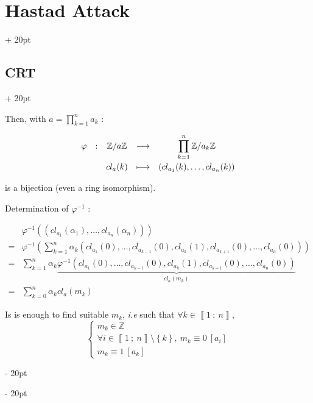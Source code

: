 \documentclass[a4paper, 12pt, twoside]{article}
\newcommand{\Z}{\mathbb{Z}} %
\newcommand{\nset}[2]{\left\llbracket #1\ ;\ #2 \right\rrbracket}
\newcommand{\lr}[1]{\left( #1 \right)}
\newcommand{\set}[1]{\left\{ #1 \right\}}
\newcommand{\ind}[1][20pt]{\advance\leftskip + #1}
\newcommand{\deind}[1][20pt]{\advance\leftskip - #1}
\newenvironment{indt}[2][20pt]{#2 \par \ind[#1]}{\par \deind} %
\begin{document}
\begin{indt}{\section{Hastad Attack}}
\begin{indt}{\subsection{CRT}}
\begin{pseudocode}
                Then, with $\displaystyle a = \prod_{k = 1}^n a_k$ :
            
                \[
                    \begin{array}{ccccc}
                        \varphi & : & \Z/a\Z & \longrightarrow & \displaystyle \prod_{k = 1}^n \Z / a_k \Z
                        \vspace{3pt}
                        \\
                                &   & cl_a(k) & \longmapsto & (cl_{a_1}(k), \ldots, cl_{a_n}(k))
                    \end{array}
                \]
            
                is a bijection (even a ring isomorphism).
            
                \vspace{12pt}
            
                Determination of $\varphi^{-1}$ :
            
                \[
                    \begin{array}{cl}
                        & \varphi^{-1}((cl_{a_1}(\alpha_1), \ldots, cl_{a_n}(\alpha_n)))
                        \\
                        =& \displaystyle
                        \varphi^{-1}\!\lr{\sum_{k = 1}^n \alpha_k \lr{cl_{a_1}(0), \ldots, cl_{a_{k - 1}}(0), cl_{a_k}(1), cl_{a_{k + 1}}(0), \ldots, cl_{a_n}(0)}}
                        \\
                        =& \displaystyle
                        \sum_{k = 1}^n \alpha_k \underbrace{\varphi^{-1} \lr{cl_{a_1}(0), \ldots, cl_{a_{k - 1}}(0), cl_{a_k}(1), cl_{a_{k + 1}}(0), \ldots, cl_{a_n}(0)}}_{cl_a(m_k)}
                        \\
                        =& \displaystyle \sum_{k = 0}^n \alpha_k cl_a(m_k)
                    \end{array}
                \]
            
                Is is enough to find suitable $m_k$, \textit{i.e} such that $\forall k \in \nset 1 n$,
                \[
                    \begin{cases}
                        m_k \in \Z
                        \\
                        \forall i \in \nset 1 n \setminus \set k,\
                        m_k \equiv 0\ [a_i]
                        \\
                        m_k \equiv 1\ [a_k]
                    \end{cases}
                \]
            

\end{pseudocode}
\end{indt}
\end{indt}
\end{document}
